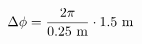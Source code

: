 \documentclass[preview]{standalone}
\begin{document}
\begin{align*}
\special{dvisvgm:raw <g id='unique000'>}\Delta\phi = \frac{2\pi}{0.25 \text{ m}} \cdot 1.5 \text{ m}\special{dvisvgm:raw </g>}
\end{align*}
\end{document}
